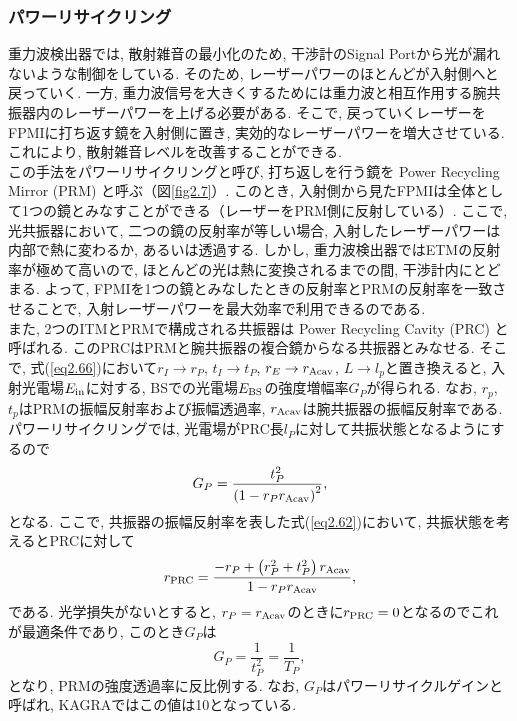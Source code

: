 \subsubsection{パワーリサイクリング}
\vskip3mm
重力波検出器では, 散射雑音の最小化のため, 干渉計のSignal Portから光が漏れないような制御をしている. そのため, レーザーパワーのほとんどが入射側へと戻っていく. 一方, 重力波信号を大きくするためには重力波と相互作用する腕共振器内のレーザーパワーを上げる必要がある. そこで, 戻っていくレーザーをFPMIに打ち返す鏡を入射側に置き, 実効的なレーザーパワーを増大させている. これにより, 散射雑音レベルを改善することができる\cite{power}. \\
\quad この手法をパワーリサイクリングと呼び, 打ち返しを行う鏡を Power Recycling Mirror (PRM) と呼ぶ（図\ref{fig2.7}）. このとき, 入射側から見たFPMIは全体として1つの鏡とみなすことができる（レーザーをPRM側に反射している）. ここで, 光共振器において, 二つの鏡の反射率が等しい場合, 入射したレーザーパワーは内部で熱に変わるか, あるいは透過する. しかし, 重力波検出器ではETMの反射率が極めて高いので, ほとんどの光は熱に変換されるまでの間, 干渉計内にとどまる. よって, FPMIを1つの鏡とみなしたときの反射率とPRMの反射率を一致させることで, 入射レーザーパワーを最大効率で利用できるのである. \\
\quad また, 2つのITMとPRMで構成される共振器は Power Recycling Cavity (PRC) と呼ばれる. このPRCはPRMと腕共振器の複合鏡からなる共振器とみなせる. そこで, 式(\ref{eq2.66})において$r_I\rightarrow r_P$, $t_I\rightarrow t_P$, $r_E\rightarrow r_{\rm Acav}$, $L\rightarrow l_p$と置き換えると, 入射光電場$E_{\rm in}$に対する, BSでの光電場$E_{\rm BS}$の強度増幅率$G_P$が得られる. なお, $r_p$, $t_p$はPRMの振幅反射率および振幅透過率, $r_{\rm Acav}$は腕共振器の振幅反射率である. パワーリサイクリングでは, 光電場がPRC長$l_{P}$に対して共振状態となるようにするので
\begin{equation}
G_P=\frac{t_P^2}{\left(1-r_Pr_{\rm Acav}\right)^2},
\end{equation}
となる. ここで, 共振器の振幅反射率を表した式(\ref{eq2.62})において, 共振状態を考えるとPRCに対して
\begin{equation}
r_{\rm PRC}=\frac{-r_P+\left(r_P^2+t_P^2\right)r_{\rm Acav}}{1-r_Pr_{\rm Acav}},
\end{equation}
である. 光学損失がないとすると, $r_P=r_{\rm Acav}$のときに$r_{\rm PRC}=0$となるのでこれが最適条件であり, このとき$G_P$は
\begin{equation}
G_P=\frac{1}{t_P^2}=\frac{1}{T_P},
\end{equation}
となり, PRMの強度透過率に反比例する. なお, $G_P$はパワーリサイクルゲインと呼ばれ, KAGRAではこの値は10となっている. 
